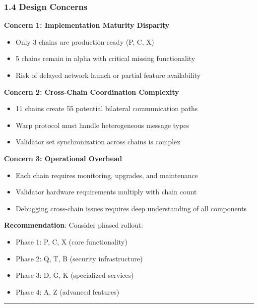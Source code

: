 \documentclass[
]{article}
\providecommand{\tightlist}{%
  \setlength{\itemsep}{0pt}\setlength{\parskip}{0pt}}
\begin{document}
\subsubsection{1.4 Design Concerns}\label{14-design-concerns}

\textbf{Concern 1: Implementation Maturity Disparity}

\begin{itemize}
\tightlist
\item
  Only 3 chains are production-ready (P, C, X)
\item
  5 chains remain in alpha with critical missing functionality
\item
  Risk of delayed network launch or partial feature availability
\end{itemize}

\textbf{Concern 2: Cross-Chain Coordination Complexity}

\begin{itemize}
\tightlist
\item
  11 chains create 55 potential bilateral communication paths
\item
  Warp protocol must handle heterogeneous message types
\item
  Validator set synchronization across chains is complex
\end{itemize}

\textbf{Concern 3: Operational Overhead}

\begin{itemize}
\tightlist
\item
  Each chain requires monitoring, upgrades, and maintenance
\item
  Validator hardware requirements multiply with chain count
\item
  Debugging cross-chain issues requires deep understanding of all
  components
\end{itemize}

\textbf{Recommendation}: Consider phased rollout:

\begin{itemize}
\tightlist
\item
  Phase 1: P, C, X (core functionality)
\item
  Phase 2: Q, T, B (security infrastructure)
\item
  Phase 3: D, G, K (specialized services)
\item
  Phase 4: A, Z (advanced features)
\end{itemize}

\begin{center}\rule{0.5\linewidth}{0.5pt}\end{center}
\end{document}

